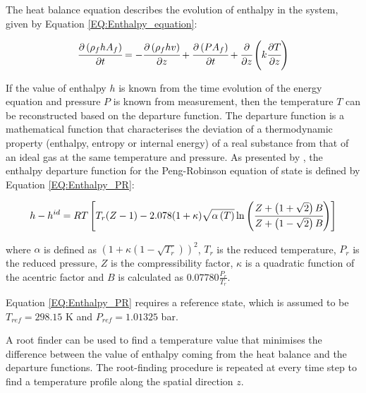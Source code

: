\documentclass[a4paper,fleqn]{cas-dc}
\begin{document}
		The heat balance equation describes the evolution of enthalpy in the system, given by Equation \ref{EQ:Enthalpy_equation}:
		
		{\footnotesize
			\begin{equation} \label{EQ:Enthalpy_equation}
				\cfrac{\partial \left(\rho_f {\color{black}h} A_f\right)}{\partial t} = - \cfrac{\partial \left( \rho_f {\color{black}h}  v \right)}{\partial z} + \cfrac{\partial \left(P A_f\right)}{\partial t} + \cfrac{\partial}{\partial z} \left( k \cfrac{\partial T}{\partial z} \right)
			\end{equation}
		}
		
		If the value of enthalpy $h$ is known from the time evolution of the energy equation and pressure $P$ is known from measurement, then the temperature $T$ can be reconstructed based on the departure function. The departure function is a mathematical function that characterises the deviation of a thermodynamic property (enthalpy, entropy or internal energy) of a real substance from that of an ideal gas at the same temperature and pressure. As presented by \citet{Gmehling2019}, the enthalpy departure function for the Peng-Robinson equation of state is defined by Equation \ref{EQ:Enthalpy_PR}:
		
		{\scriptsize
			\begin{equation}
				{\color{black}h}-{\color{black}h}^{id}={\color{black}R}T \left[{\color{black}T_r}({\color{black}Z}-1) -2.078(1+{\color{black}\kappa} ){\sqrt { {\color{black}\alpha}\left(T\right) } } \ln \left(\cfrac{{\color{black}Z}+\left( 1+\sqrt{2} \right){\color{black}B}}{{\color{black}Z}+\left( 1-\sqrt{2} \right){\color{black}B}}\right)\right]
				\label{EQ:Enthalpy_PR}
			\end{equation}				
		}
		
		where $\alpha$ is defined as $\left( 1+\kappa \left( 1 - \sqrt{T_r} \right) \right)^2$, $T_r$ is the reduced temperature, $P_r$ is the reduced pressure, $Z$ is the compressibility factor, $\kappa$ is a quadratic function of the acentric factor and $B$ is calculated as $0.07780\frac{P_r}{T_r}$.
		
		Equation \ref{EQ:Enthalpy_PR} requires a reference state, which is assumed to be $T_{ref}=298.15$ K and $P_{ref}=1.01325$ bar.
		
		A root finder can be used to find a temperature value that minimises the difference between the value of enthalpy coming from the heat balance and the departure functions. The root-finding procedure is repeated at every time step to find a temperature profile along the spatial direction $z$.
		
\end{document}
